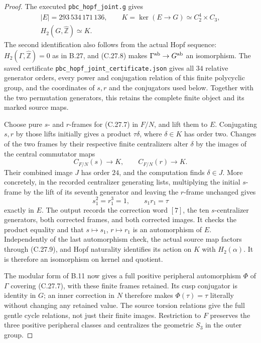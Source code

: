 \begin{proof}
The executed \texttt{pbc\_hopf\_joint.g} gives
\[
 \begin{gathered}
 |E|=293\,534\,171\,136,\qquad
 K=\ker(E\to G)\simeq C_2^4\times C_3,\\
 H_2(G,\widehat{\mathbb Z})\simeq K.
 \end{gathered}
 \tag{C.27.11}
\]
The second identification also follows from the actual Hopf
sequence: $H_2(\Gamma,\widehat{\mathbb Z})=0$ as in B.27,
and (C.27.8) makes $\Gamma^{\rm ab}\to G^{\rm ab}$ an
isomorphism. The saved certificate
\texttt{pbc\_hopf\_joint\_certificate.json} gives all $34$
relative generator orders, every power and conjugation
relation of this finite polycyclic group, and the coordinates
of $s,r$ and the conjugators used below. Together with the
two permutation generators, this retains the complete finite
object and its marked source maps.

Choose pure $s$- and $r$-frames for (C.27.7) in $F/N$,
and lift them to $E$. Conjugating $s,r$ by those lifts
initially gives a product $\tau\delta$, where $\delta\in K$
has order two. Changes of the two frames by their respective
finite centralizers alter $\delta$ by the images of the
central commutator maps
\[
 C_{F/N}(s)\longrightarrow K,\qquad
 C_{F/N}(r)\longrightarrow K.
 \tag{C.27.12}
\]
Their combined image $J$ has order $24$, and the computation
finds $\delta\in J$. More concretely, in the recorded
centralizer generating lists, multiplying the initial
$s$-frame by the lift of its seventh generator and leaving
the $r$-frame unchanged gives
\[
                 s_1^2=r_1^3=1,\qquad s_1r_1=\tau
 \tag{C.27.13}
\]
exactly in $E$. The output records the correction word
$[7]$, the ten $s$-centralizer generators, both corrected
frames, and both corrected images. It checks the product
equality and that $s\mapsto s_1$, $r\mapsto r_1$ is an
automorphism of $E$.
Independently of the last automorphism check, the actual
source map factors through (C.27.9), and Hopf naturality
identifies its action on $K$ with $H_2(\alpha)$.
It is therefore an isomorphism on kernel and quotient.

The modular form of B.11 now gives a full positive
peripheral automorphism $\Phi$ of $\Gamma$ covering
(C.27.7), with these finite frames retained.
Its cusp conjugator is identity in $G$; an inner correction
in $N$ therefore makes $\Phi(\tau)=\tau$ literally without
changing any retained value. The source torsion relations
give the full gentle cycle relations, not just their finite
images. Restriction to $F$ preserves the three positive
peripheral classes and centralizes the geometric $S_3$
in the outer group.


\end{proof}
